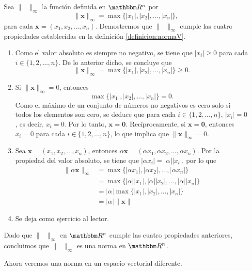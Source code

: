 \begin{examplebox}{}{}
    Sea $\| \phantom{x} \|_{\infty}$ la función definida en $\RR[n]$ por
    $$\| \mathbf{x} \|_{\infty} = \max \{ |x_1|, |x_2|, \dots, |x_n| \},$$
    para cada $\mathbf{x} = (x_1, x_2, \dots, x_n)$. Demostremos que $\| \phantom{x} \|_{\infty}$ cumple las cuatro propiedades establecidas en la definición \ref{definicion:normaV}.
    \begin{enumerate}[label=\roman*), topsep=6pt, itemsep=0pt]
        \item Como el valor absoluto es siempre no negativo, se tiene que $|x_i| \geq 0$ para cada $i \in \{ 1, 2, \dots, n \}$. De lo anterior dicho, se concluye que
        $$\| \mathbf{x} \|_{\infty} = \max \{ |x_1|, |x_2|, \dots, |x_n| \} \geq 0.$$
        \item Si $\| \mathbf{x} \|_{\infty} = 0$, entonces
        $$\max \{ |x_1|, |x_2|, \dots, |x_n| \} = 0.$$
        Como el máximo de un conjunto de números no negativos es cero solo si todos los elementos son cero, se deduce que para cada $i \in \{ 1, 2, \dots, n \}$, $|x_i| = 0$, es decir, $x_i = 0$. Por lo tanto, $\mathbf{x} = \mathbf{0}$. Recíprocamente, si $\mathbf{x} = \mathbf{0}$, entonces $x_i = 0$ para cada $i \in \{ 1, 2, \dots, n \}$, lo que implica que $\| \mathbf{x} \|_\infty = 0$.
        \item Sea $\mathbf{x} = (x_1, x_2, \dots, x_n)$, entonces $\alpha \mathbf{x} = (\alpha x_1, \alpha x_2, \dots, \alpha x_n)$. Por la propiedad del valor absoluto, se tiene que $|\alpha x_i| = |\alpha| |x_i|$, por lo que
        \begin{align*}
            \| \alpha \mathbf{x} \|_{\infty} & = \max \{ |\alpha x_1|, |\alpha x_2|, \dots, |\alpha x_n| \} \\
            & = \max \{ |\alpha| |x_1|, |\alpha| |x_2|, \dots, |\alpha| |x_n| \} \\
            & = |\alpha| \max \{ |x_1|, |x_2|, \dots, |x_n| \} \\
            & = |\alpha| \| \mathbf{x} \|
        \end{align*}
        \item Se deja como ejercicio al lector.
    \end{enumerate}
    Dado que $\| \phantom{x} \|_{\infty}$ en $\RR[n]$ cumple las cuatro propiedades anteriores, concluimos que $\| \phantom{x} \|_{\infty}$ es una norma en $\RR[n]$.
\end{examplebox}

Ahora veremos una norma en un espacio vectorial diferente.

